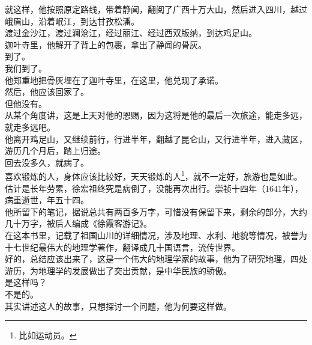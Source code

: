 \begin{multicols}{\theparacolNo}
就这样，他按照原定路线，带着静闻，翻阅了广西十万大山，然后进入四川，越过峨眉山，沿着岷江，到达甘孜松潘。\\

渡过金沙江，渡过澜沧江，经过丽江、经过西双版纳，到达鸡足山。\\

迦叶寺里，他解开了背上的包裹，拿出了静闻的骨灰。\\

到了。\\

我们到了。\\

他郑重地把骨灰埋在了迦叶寺里，在这里，他兑现了承诺。\\

然后，他应该回家了。\\

但他没有。\\

从某个角度讲，这是上天对他的恩赐，因为这将是他的最后一次旅途，能走多远，就走多远吧。\\

他离开鸡足山，又继续前行，行进半年，翻越了昆仑山，又行进半年，进入藏区，游历几个月后，踏上归途。\\

回去没多久，就病了。\\

喜欢锻炼的人，身体应该比较好，天天锻炼的人\footnote{比如运动员。}，就不一定好，旅游也是如此。\\

估计是长年劳累，徐宏祖终究是病倒了，没能再次出行。崇祯十四年（1641年），病重逝世，年五十四。\\

他所留下的笔记，据说总共有两百多万字，可惜没有保留下来，剩余的部分，大约几十万字，被后人编成《徐霞客游记》。\\

在这本书里，记载了祖国山川的详细情况，涉及地理、水利、地貌等情况，被誉为十七世纪最伟大的地理学著作，翻译成几十国语言，流传世界。\\

好的，总结应该出来了，这是一个伟大的地理学家的故事，他为了研究地理，四处游历，为地理学的发展做出了突出贡献，是中华民族的骄傲。\\

是这样吗？\\

不是的。\\

其实讲述这人的故事，只想探讨一个问题，他为何要这样做。\\


\end{multicols}
